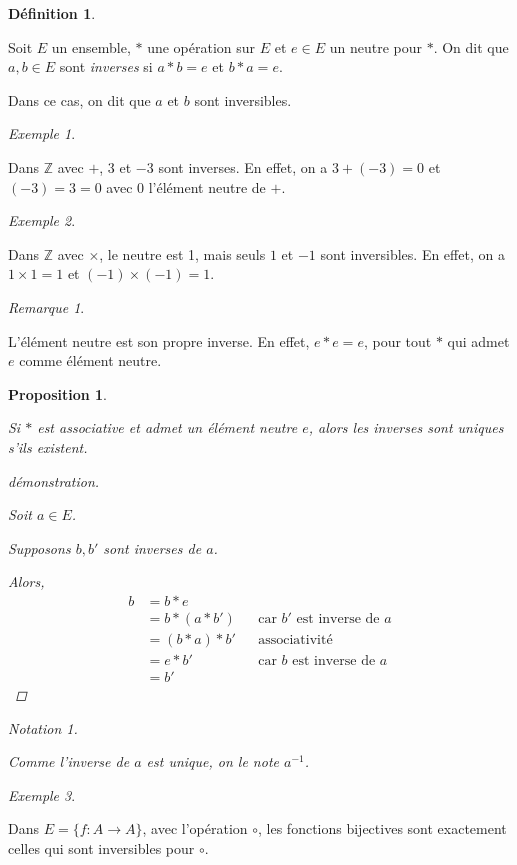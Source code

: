 \documentclass{report}
\newcommand*{\entiers}{\mathbb{Z}}
\newtheorem*{prop}{Proposition}
\theoremstyle{definition}
\newtheorem*{defin}{D\'efinition}
\theoremstyle{remark}
\newtheorem*{exem}{Exemple}
\newtheorem*{nota}{Notation}
\newtheorem*{rema}{Remarque}
\begin{document}
	\begin{defin}
		~

		Soit $E$ un ensemble, $*$ une op\'eration sur $E$ et $e \in E$ un neutre pour $*$. On dit que $a,b \in E$ sont \emph{inverses} si $a*b=e$ et $b*a=e$.

		Dans ce cas, on dit que $a$ et $b$ sont inversibles.
	\end{defin}
	\begin{exem}
		~

		Dans $\entiers$ avec $+$, $3$ et $-3$ sont inverses. En effet, on a $3+(-3)=0$ et $(-3)=3=0$ avec $0$ l'\'el\'ement neutre de $+$.
	\end{exem}
	\begin{exem}
		~

		Dans $\entiers$ avec $\times$, le neutre est 1, mais seuls $1$ et $-1$ sont inversibles. En effet, on a $1 \times 1=1$ et $(-1) \times (-1)=1$.
	\end{exem}
	\begin{rema}
		~

		L'\'el\'ement neutre est son propre inverse. En effet, $e*e=e$, pour tout $*$ qui admet $e$ comme \'el\'ement neutre.
	\end{rema}
	\begin{prop}
		~

		Si $*$ est associative et admet un \'el\'ement neutre $e$, alors les inverses sont uniques s'ils existent.
		\begin{proof}[d\'emonstration]~

			Soit $a \in E$.

			Supposons $b,b'$ sont inverses de $a$.

			Alors,
			\begin{align*}
				b&=b*e\\
				&=b*(a*b')&&\text{car $b'$ est inverse de $a$}\\
				&=(b*a)*b'&&\text{associativit\'e}\\
				&=e*b'&&\text{car $b$ est inverse de $a$}\\
				&=b'
			\end{align*}
		\end{proof}
		\begin{nota}
			~

			Comme l'inverse de $a$ est unique, on le note $a^{-1}$.
		\end{nota}
	\end{prop}
	\begin{exem}
		~

		Dans $E=\{f:A \to A\}$, avec l'op\'eration $\circ$, les fonctions bijectives sont exactement celles qui sont inversibles pour $\circ$.
	\end{exem}
\end{document}
